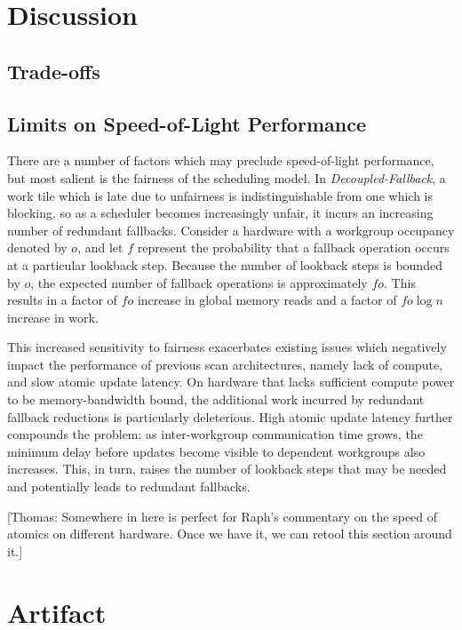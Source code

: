\documentclass[sigconf]{acmart}
\newcommand{\thomas}[1]{{\footnotesize\color{orange}[Thomas: #1]}}
\begin{document}
\section{Discussion}

\subsection{Trade-offs}

\subsection{Limits on Speed-of-Light Performance}
There are a number of factors which may preclude speed-of-light performance, but most salient is the fairness of the scheduling model. In \emph{Decoupled-Fallback}, a work tile which is late due to unfairness is indistinguishable from one which is blocking, so as a scheduler becomes increasingly unfair, it incurs an increasing number of redundant fallbacks. Consider a hardware with a workgroup occupancy denoted by $o$, and let $f$ represent the probability that a fallback operation occurs at a particular lookback step. Because the number of lookback steps is bounded by $o$, the expected number of fallback operations is approximately $fo$. This results in a factor of $fo$ increase in global memory reads and a factor of $fo\log{n}$ increase in work.

This increased sensitivity to fairness exacerbates existing issues which negatively impact the performance of previous scan architectures, namely lack of compute, and slow atomic update latency. On hardware that lacks sufficient compute power to be memory-bandwidth bound, the additional work incurred by redundant fallback reductions is particularly deleterious. High atomic update latency further compounds the problem: as inter-workgroup communication time grows, the minimum delay before updates become visible to dependent workgroups also increases. This, in turn, raises the number of lookback steps that may be needed and potentially leads to redundant fallbacks.

\thomas{Somewhere in here is perfect for Raph's commentary on the speed of atomics on different hardware. Once we have it, we can retool this section around it.}

\begin{acks}
\end{acks}

\clearpage
\appendix
\section{Artifact}
\end{document}
